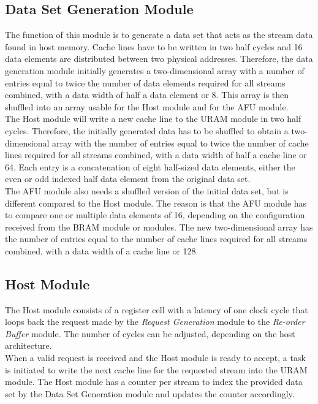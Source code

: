 \subsection{Data Set Generation Module}
The function of this module is to generate a data set that acts as the stream data found in host memory. Cache lines have to be written in two half cycles and \SI{16}{\byte} data elements are distributed between two physical addresses. Therefore, the data generation module initially generates a two-dimensional array with a number of entries equal to twice the number of data elements required for all streams combined, with a data width of half a data element or \SI{8}{\byte}. This array is then shuffled into an array usable for the Host module and for the AFU module.\\
The Host module will write a new cache line to the URAM module in two half cycles. Therefore, the initially generated data has to be shuffled to obtain a two-dimensional array with the number of entries equal to twice the number of cache lines required for all streams combined, with a data width of half a cache line or \SI{64}{\byte}. Each entry is a concatenation of eight half-sized data elements, either the even or odd indexed half data element from the original data set.\\
The AFU module also needs a shuffled version of the initial data set, but is different compared to the Host module. The reason is that the AFU module has to compare one or multiple data elements of \SI{16}{\byte}, depending on the configuration received from the BRAM module or modules. The new two-dimensional array has the number of entries equal to the number of cache lines required for all streams combined, with a data width of a cache line or \SI{128}{\byte}.



\subsection{Host Module}
The Host module consists of a register cell with a latency of one clock cycle that loops back the request made by the \textit{Request Generation} module to the \textit{Re-order Buffer} module. The number of cycles can be adjusted, depending on the host architecture.\\
When a valid request is received and the Host module is ready to accept, a task is initiated to write the next cache line for the requested stream into the URAM module. The Host module has a counter per stream to index the provided data set by the Data Set Generation module and updates the counter accordingly.

